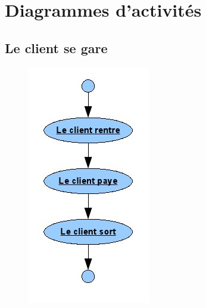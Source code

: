 \documentclass[a4paper]{article}
\begin{document}
\section{Diagrammes d'activit\'es}
\subsection{Le client se gare}
\begin{figure}[!ht]
\centering
\includegraphics[scale=.5]{imgs/act_segare.jpg}
\end{figure}
\newpage
\end{document}
